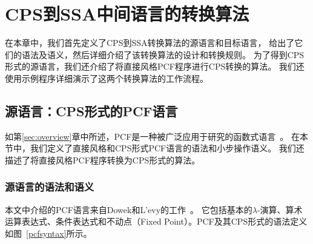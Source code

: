 
\chapter{CPS到SSA中间语言的转换算法} \label{ch:trans}

在本章中，我们首先定义了CPS到SSA转换算法的源语言和目标语言，
给出了它们的语法及语义，然后详细介绍了该转换算法的设计和转换规则。
为了得到CPS形式的源语言，我们还介绍了将直接风格PCF程序进行CPS转换的算法。
我们还使用示例程序详细演示了这两个转换算法的工作流程。

\section{源语言：CPS形式的PCF语言} \label{sec:cps}

如第\ref{sec:overview}章中所述，PCF是一种被广泛应用于研究的函数式语言~\cite{plotkin1977lcf}。
在本节中，我们定义了直接风格和CPS形式PCF语言的语法和小步操作语义。
我们还描述了将直接风格PCF程序转换为CPS形式的算法。

\subsection{源语言的语法和语义}

本文中介绍的PCF语言来自Dowek和L{'e}vy的工作~\cite{dowek2010introduction}。
它包括基本的$\lambda$-演算、算术运算表达式、条件表达式和不动点（Fixed Point）。PCF及其CPS形式的语法定义如图~\ref{pcfsyntax}所示。

